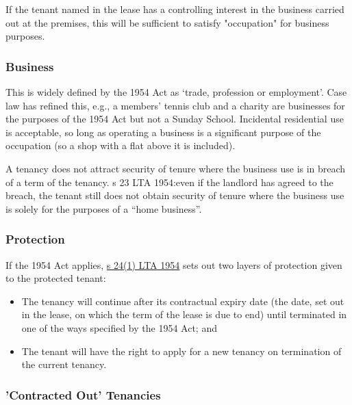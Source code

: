 \documentclass[
]{article}
\providecommand{\tightlist}{%
  \setlength{\itemsep}{0pt}\setlength{\parskip}{0pt}}
\begin{document}
If the tenant named in the lease has a controlling interest in the
business carried out at the premises, this will be sufficient to satisfy
"occupation" for business purposes.

\hypertarget{business}{%
\subsubsection{Business}\label{business}}

This is widely defined by the 1954 Act as `trade, profession or
employment'. Case law has refined this, e.g., a members' tennis club and
a charity are businesses for the purposes of the 1954 Act but not a
Sunday School. Incidental residential use is acceptable, so long as
operating a business is a significant purpose of the occupation (so a
shop with a flat above it is included).

A tenancy does not attract security of tenure where the business use is
in breach of a term of the tenancy. s 23 LTA 1954:even if the landlord
has agreed to the breach, the tenant still does not obtain security of
tenure where the business use is solely for the purposes of a ``home
business''.

\hypertarget{protection}{%
\subsubsection{Protection}\label{protection}}

If the 1954 Act applies,
\href{https://www.legislation.gov.uk/ukpga/Eliz2/2-3/56/section/24}{s
24(1) LTA 1954} sets out two layers of protection given to the protected
tenant:

\begin{itemize}
\tightlist
\item
  The tenancy will continue after its contractual expiry date (the date,
  set out in the lease, on which the term of the lease is due to end)
  until terminated in one of the ways specified by the 1954 Act; and
\item
  The tenant will have the right to apply for a new tenancy on
  termination of the current tenancy.
\end{itemize}

\hypertarget{contracted-out-tenancies}{%
\subsubsection{'Contracted Out'
Tenancies}\label{contracted-out-tenancies}}
\end{document}

